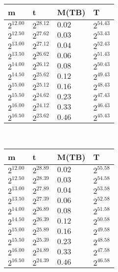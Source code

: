 \begin{tabular}{llll}
m & t & M(TB) & T \\ \hline
$2^{12.00}$ & $2^{28.12}$ & $0.02$ & $2^{54.43}$ \\
$2^{12.50}$ & $2^{27.62}$ & $0.03$ & $2^{53.43}$ \\
$2^{13.00}$ & $2^{27.12}$ & $0.04$ & $2^{52.43}$ \\
$2^{13.50}$ & $2^{26.62}$ & $0.06$ & $2^{51.43}$ \\
$2^{14.00}$ & $2^{26.12}$ & $0.08$ & $2^{50.43}$ \\
$2^{14.50}$ & $2^{25.62}$ & $0.12$ & $2^{49.43}$ \\
$2^{15.00}$ & $2^{25.12}$ & $0.16$ & $2^{48.43}$ \\
$2^{15.50}$ & $2^{24.62}$ & $0.23$ & $2^{47.43}$ \\
$2^{16.00}$ & $2^{24.12}$ & $0.33$ & $2^{46.43}$ \\
$2^{16.50}$ & $2^{23.62}$ & $0.46$ & $2^{45.43}$ \\
\end{tabular}
 \ 
\begin{tabular}{llll}
m & t & M(TB) & T \\ \hline
$2^{12.00}$ & $2^{28.89}$ & $0.02$ & $2^{55.58}$ \\
$2^{12.50}$ & $2^{28.39}$ & $0.03$ & $2^{54.58}$ \\
$2^{13.00}$ & $2^{27.89}$ & $0.04$ & $2^{53.58}$ \\
$2^{13.50}$ & $2^{27.39}$ & $0.06$ & $2^{52.58}$ \\
$2^{14.00}$ & $2^{26.89}$ & $0.08$ & $2^{51.58}$ \\
$2^{14.50}$ & $2^{26.39}$ & $0.12$ & $2^{50.58}$ \\
$2^{15.00}$ & $2^{25.89}$ & $0.16$ & $2^{49.58}$ \\
$2^{15.50}$ & $2^{25.39}$ & $0.23$ & $2^{48.58}$ \\
$2^{16.00}$ & $2^{24.89}$ & $0.33$ & $2^{47.58}$ \\
$2^{16.50}$ & $2^{24.39}$ & $0.46$ & $2^{46.58}$ \\
\end{tabular}
 \ 
